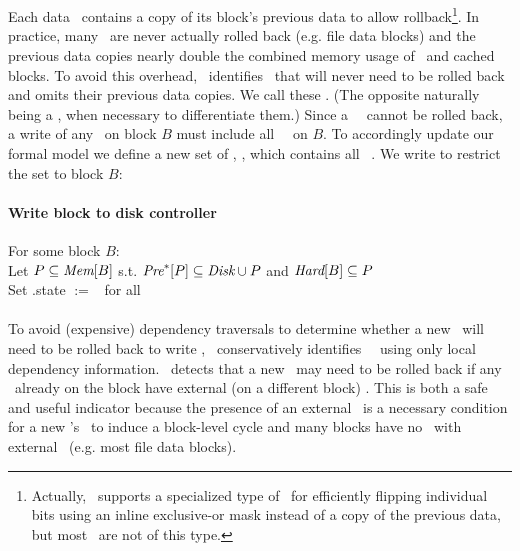 \subsection{\Nrb\ \ChDescs}
\label{sec:chdescs:nrb}

Each data \chdesc\ contains a copy of its block's previous data to
allow rollback\footnote{Actually, \Kudos\ supports a specialized type of \chdesc\ for
efficiently flipping individual bits using an inline exclusive-or mask instead
of a copy of the previous data, but most \chdescs\ are not of this type.}.
%
In practice, many \chdesc\ are never actually rolled back (e.g. file
data blocks)
%
and the previous data copies nearly double the combined memory usage of
\chdescs\ and cached blocks.
%
To avoid this overhead, \Kudos\ identifies \chdescs\ that will never
need to be rolled back and omits their previous data copies. We call
these \emph{\nrb} \chdescs. (The opposite naturally being a \emph{\rb}
\chdesc, when necessary to differentiate them.)
%
Since a \nrb\ \chdesc\ cannot be rolled back, a write of any \chdescs\
on block $B$ must include all \nrb\ \chdescs\ on $B$. To accordingly
update our formal model we define a new set of \chdescs, \ChNrb, which
contains all \nrb\ \chdescs. We write \ChNrbB{B} to restrict the set
to block $B$\todo{Introduce \ChRb\ and \ChRbB{B}.}:

\paragraph{Write block to disk controller}
For some block $B$: \\
Let \(P \subseteq \textit{Mem}[B]\) s.t.
\(\textit{Pre}^*[P] \subseteq \textit{Disk} \cup P\) and \(\textit{Hard}[B] \subseteq P\) \\
Set \p{p}.state $:=$ \stateinf\ for all \inset{p}{P}

\paragraph{}
To avoid (expensive) dependency traversals to determine whether a new
\chdesc\ will need to be rolled back to write \ChAll,
%
\Kudos\ conservatively identifies \nrb\ \chdescs\ using only local
dependency information.
%
\Kudos\ detects that a new \chdesc\ may need to be rolled back if any
\chdescs\ already on the block have external (on a different
block)
\afters.
%
This is both a safe and useful indicator because
%
the presence of an external \after\ is a necessary condition for a new
\chdesc's \before\ to induce a block-level cycle
%
and many blocks have no \chdescs\ with external \afters\ (e.g. most
file data blocks).

